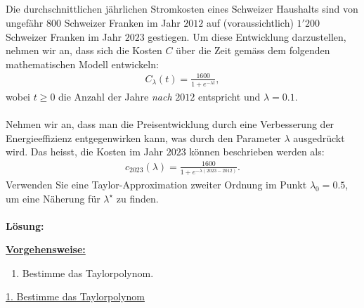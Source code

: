 \newpage

\subsection*{}
Die durchschnittlichen jährlichen Stromkosten eines Schweizer Haushalts sind von ungefähr $800$ Schweizer Franken im Jahr $2012$ auf (voraussichtlich) $1'200$ Schweizer Franken im Jahr $2023$ gestiegen. Um diese Entwicklung darzustellen, nehmen wir an, dass sich die Kosten $C$ über die Zeit gemäss dem folgenden mathematischen Modell entwickeln:
\begin{align*}
	C_\lambda(t)
	=
	\frac{1600}{1 + e^{-\lambda t}},
\end{align*}
wobei $t \geq 0$ die Anzahl der Jahre \textit{nach} $2012$ entspricht und $\lambda = 0.1$.
\\
\\
Nehmen wir an, dass man die Preisentwicklung durch eine Verbesserung der Energieeffizienz entgegenwirken kann, was durch den Parameter $\lambda$ ausgedrückt wird. Das heisst, die Kosten im Jahr $2023$ können beschrieben werden als:
\begin{align*}
	c_{2023}(\lambda) 
	=
	\frac{1600}{1 + e^{- \lambda (2023 - 2012)}}.
\end{align*}
Verwenden Sie eine Taylor-Approximation zweiter Ordnung im Punkt $ \lambda_0 = 0.5 $, um eine Näherung für $ \lambda^\star $ zu finden.
\\
 \\
\textbf{Lösung:}
\begin{mdframed}
\underline{\textbf{Vorgehensweise:}}
\renewcommand{\labelenumi}{\theenumi.}
\begin{enumerate}
\item Bestimme das Taylorpolynom. 
\end{enumerate}
\end{mdframed}

\underline{1. Bestimme das Taylorpolynom}\\

\newpage
